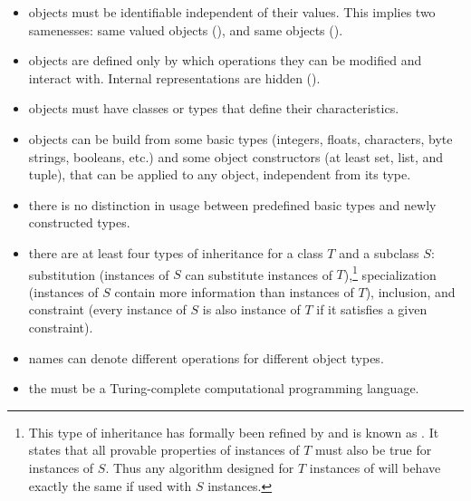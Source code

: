 \begin{itemize}

\item objects must be identifiable independent of their values. This implies
two samenesses: same valued objects (), and same
objects ().

\item objects are defined only by which operations they can be modified and
interact with. Internal representations are hidden ().

\item objects must have classes or types that define their characteristics.

\item objects can be build from some basic types (integers, floats, characters,
byte strings, booleans, etc.) and some object constructors (at least set, list,
and tuple), that can be applied to any object, independent from its type.

\item there is no distinction in usage between predefined basic types and
newly constructed types.

\item there are at least four types of inheritance for a class $T$
and a subclass $S$: substitution (instances of $S$ can substitute instances
of $T$),\footnote{This type of inheritance has formally been refined by
\textcite{Liskov1987} and is known as . It
states that all provable properties of instances of $T$ must also be true for
instances of $S$. Thus any algorithm designed for $T$ instances of will
behave exactly the same if used with $S$ instances.} specialization (instances
of $S$ contain more information than instances of $T$), inclusion, and
constraint (every instance of $S$ is also instance of $T$ if
it satisfies a given constraint).

\item names can denote different operations for different object types.

\item the  must be a Turing-complete computational
programming language.

\end{itemize}

